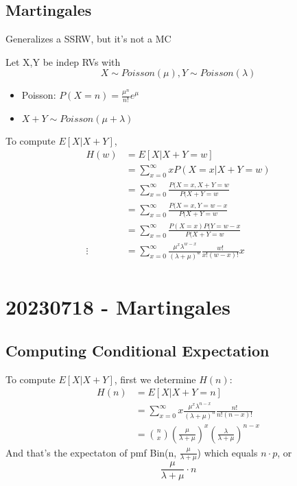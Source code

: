 \documentclass{report}
\begin{document}
    \section{Martingales}%
    Generalizes a SSRW, but it's not a MC
     {
      Let X,Y be indep RVs with
      \[ X \sim Poisson(\mu), Y \sim Poisson(\lambda) \]
      \begin{itemize}
        \item Poisson: $P(X=n) = \frac{\mu^n}{n!} e^{\mu}$
        \item $X + Y \sim Poisson(\mu + \lambda)$
      \end{itemize}
      To compute $E[X|X+Y]$,
            \begin{align}
              H(w) &= E[X|X+Y=w] \\
                  &= \sum^{\infty}_{x=0} x P(X=x| X+Y=w)  \\
                  &= \sum^{\infty}_{x=0} \frac{P(X=x, X+Y=w}{P(X+Y=w}  \\
                  &= \sum^{\infty}_{x=0} \frac{P(X=x, Y=w-x}{P(X+Y=w}  \\
                  &= \sum^{\infty}_{x=0} \frac{P(X=x) P(Y=w-x}{P(X+Y=w}  \\
                  \vdots
                  &= \sum^{\infty}_{x=0} \frac{\mu^x \lambda^{w-x}}{(\lambda + \mu)^w} \frac{w!}{x!(w-x)!} x   \\
            \end{align}
    }

\chapter{20230718 - Martingales}%
   \section{Computing Conditional Expectation}%
   To compute $E[X|X+Y]$, first we determine $H(n)$:
            \begin{align*}
              H(n) &= E[X|X+Y=n] \\
                  &= \sum^{\infty}_{x=0} x\frac{\mu^x \lambda^{n-x}}{(\lambda + \mu)^n} \frac{n!}{n!(n-x)!} \\
                  &= \binom{n}{x} \left( \frac{\mu}{\lambda + \mu} \right)^x \left( \frac{\lambda}{\lambda + \mu} \right)^{n-x}
            \end{align*}
            And that's the expectaton of pmf Bin(n, $\frac{\mu}{\lambda + \mu}$) which equals $n \cdot p$, or
            \[ \frac{\mu}{\lambda + \mu} \cdot n \]
\end{document}
